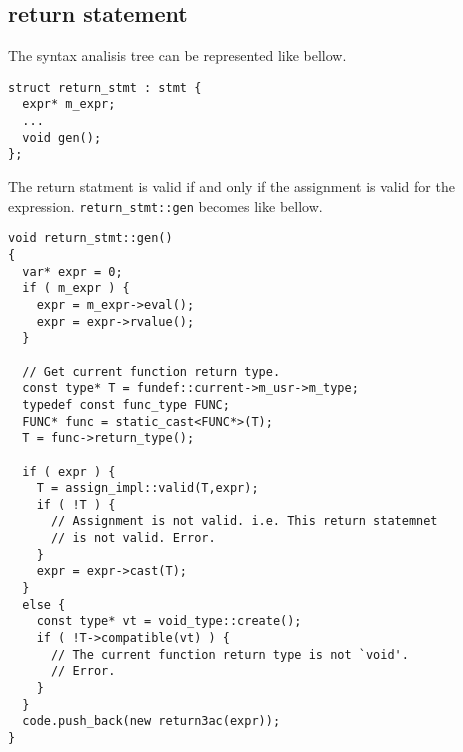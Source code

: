 \subsection{return statement}

The syntax analisis tree can be represented like bellow.
\begin{verbatim}
struct return_stmt : stmt {
  expr* m_expr;
  ...
  void gen();
};
\end{verbatim}
The return statment is valid if and only if the assignment is valid for the
expression.
{\tt{return\_stmt::gen}} becomes like bellow.
\begin{verbatim}
void return_stmt::gen()
{
  var* expr = 0;
  if ( m_expr ) {
    expr = m_expr->eval();
    expr = expr->rvalue();
  }

  // Get current function return type.
  const type* T = fundef::current->m_usr->m_type;
  typedef const func_type FUNC;
  FUNC* func = static_cast<FUNC*>(T);
  T = func->return_type();

  if ( expr ) {
    T = assign_impl::valid(T,expr);
    if ( !T ) {
      // Assignment is not valid. i.e. This return statemnet
      // is not valid. Error.
    }
    expr = expr->cast(T);
  }
  else {
    const type* vt = void_type::create();
    if ( !T->compatible(vt) ) {
      // The current function return type is not `void'.
      // Error.
    }
  }
  code.push_back(new return3ac(expr));
}
\end{verbatim}
